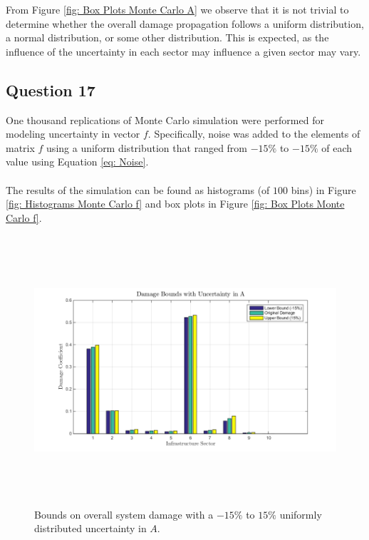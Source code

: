 \documentclass[11pt,a4paper]{article}
\begin{document}
From Figure \ref{fig: Box Plots Monte Carlo A} we observe that it is not trivial to determine whether the overall damage propagation follows a uniform distribution, a normal distribution, or some other distribution. This is expected, as the influence of the uncertainty in each sector may influence a given sector may vary. 

\subsection*{Question 17}
One thousand replications of Monte Carlo simulation were performed for modeling uncertainty in vector $f$. Specifically, noise was added to the elements of matrix $f$ using a uniform distribution that ranged from $-15\%$ to $-15\%$ of each value using Equation \ref{eq: Noise}. \\
\\ 
The results of the simulation can be found as histograms (of $100$ bins) in Figure \ref{fig: Histograms Monte Carlo f} and box plots in Figure \ref{fig: Box Plots Monte Carlo f}.
\begin{figure}[H]
	\centering
	\includegraphics[width=1\textwidth, height=10cm]
    {damage_bounds_uncertainty_A.png}
    \caption{Bounds on overall system damage with a $-15\%$ to $15\%$ uniformly distributed uncertainty in $A$.}
    \label{fig: Damage Bounds A}
\end{figure}
\end{document}
